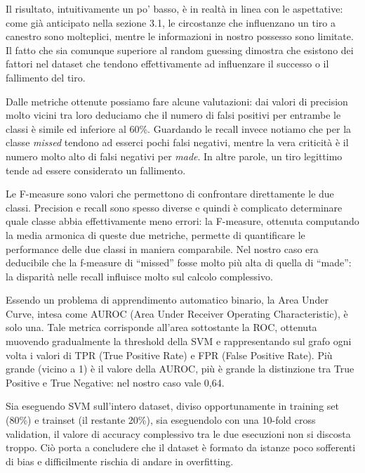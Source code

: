 \par
Il risultato, intuitivamente un po' basso, è in realtà in linea con le aspettative: come già anticipato nella sezione 3.1, le circostanze che influenzano un tiro a canestro sono molteplici, mentre le informazioni in nostro possesso sono limitate. Il fatto che sia comunque  superiore al random guessing dimostra che esistono dei fattori nel dataset che tendono effettivamente ad influenzare il successo o il fallimento del tiro.

\par
Dalle metriche ottenute possiamo fare alcune valutazioni: dai valori di precision molto vicini tra loro deduciamo che il numero di falsi positivi per entrambe le classi è simile ed inferiore al 60\%.
Guardando le recall invece notiamo che per la classe \textit{missed} tendono ad esserci pochi falsi negativi, mentre la vera criticità è il numero molto alto di falsi negativi per \textit{made}. In altre parole, un tiro legittimo tende ad essere considerato un fallimento.

Le F-measure sono valori che permettono di confrontare direttamente le due classi. Precision e recall sono spesso diverse e quindi è complicato determinare quale classe abbia effettivamente meno errori: la F-measure, ottenuta computando la media armonica di queste due metriche, permette di quantificare le performance delle due classi in maniera comparabile. Nel nostro caso era deducibile che la f-measure di “missed” fosse molto più alta di quella di “made”: la disparità nelle recall influisce molto sul calcolo complessivo.

Essendo un problema di apprendimento automatico binario, la Area Under Curve, intesa come AUROC (Area Under Receiver Operating Characteristic), è solo una. Tale metrica corrisponde all’area sottostante la ROC, ottenuta muovendo gradualmente la threshold della SVM e rappresentando sul grafo ogni volta i valori di TPR (True Positive Rate) e FPR (False Positive Rate).
Più grande (vicino a 1) è il valore della AUROC, più è grande la distinzione tra True Positive e True Negative: nel nostro caso vale 0,64.

\par
Sia eseguendo SVM sull'intero dataset, diviso opportunamente in training set (80\%) e trainset (il restante 20\%), sia eseguendolo con una 10-fold cross validation, il valore di accuracy complessivo tra le due esecuzioni non si discosta troppo. Ciò porta a concludere che il dataset è formato da istanze poco sofferenti di bias e difficilmente rischia di andare in overfitting.

